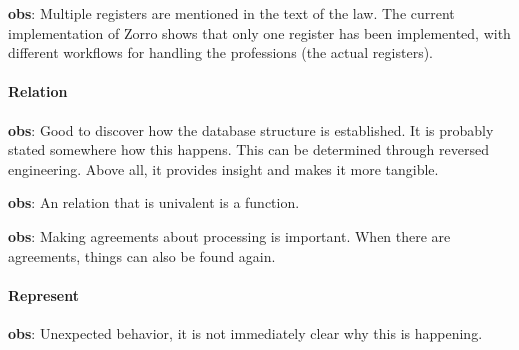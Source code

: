 \begin{obs}\label{obs:rq3-8:19-9}
    \textbf{obs}: Multiple registers are mentioned in the text of the law.
    The current implementation of Zorro shows that only one register has been implemented, with different workflows for handling the professions (the actual registers).

\end{obs}

\paragraph{Relation}
\begin{obs}\label{obs:rq1-7:10-11}
    \textbf{obs}: Good to discover how the database structure is established.
    It is probably stated somewhere how this happens.
    This can be determined through reversed engineering.
    Above all, it provides insight and makes it more tangible.
\end{obs}

\begin{obs}\label{obs:rq2-11:19-10}
    \textbf{obs}: An relation that is univalent is a function.
\end{obs}

\begin{obs}\label{obs:rq2-10:19-10}
    \textbf{obs}: Making agreements about processing is important.
    When there are agreements, things can also be found again.
\end{obs}
    
\paragraph{Represent}
\begin{obs}\label{obs:rq1-50:30-10}
    \textbf{obs}: Unexpected behavior, it is not immediately clear why this is happening.
\end{obs}

